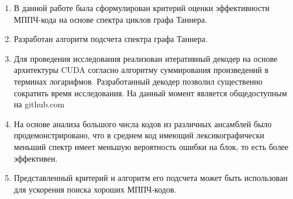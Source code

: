 \startconclusionpage

\begin{enumerate}
	\item В данной работе была сформулирован критерий оценки эффективности МППЧ-кода на основе спектра циклов графа Таннера.
	\item Разработан алгоритм подсчета спектра графа Таннера.
	\item  Для проведения исследования реализован итеративный декодер на основе архитектуры CUDA согласно алгоритму суммирования произведений в терминах логарифмов. Разработанный декодер позволил существенно сократить время исследования. На данный момент является общедоступным на github.com
	\item На основе анализа большого числа кодов из различных ансамблей было продемонстрировано, что в среднем код имеющий лексикографически меньший спектр имеет меньшую вероятность ошибки на блок, то есть более эффективен.
	\item Представленный критерий и алгоритм его подсчета может быть использован для ускорения поиска хороших МППЧ-кодов.
\end{enumerate}


 
